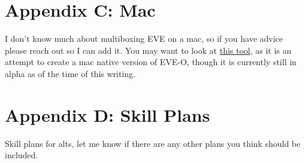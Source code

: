 \documentclass{article}
\begin{document}
\section*{Appendix C: Mac}
I don't know much about multiboxing EVE on a mac, so if you have advice please reach out so I can add it. You may want to look at \href{URLhttps://github.com/williamcpierce/Overview}{this tool},
as it is an attempt to create a mac native version of EVE-O, though it is currently still in alpha as of the time of this writing.

\section*{Appendix D: Skill Plans}
Skill plans for alts, let me know if there are any other plans you think should be included.
\end{document}
